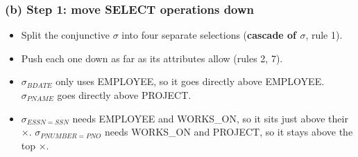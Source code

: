 \documentclass[10pt,a4paper]{article}
\newcommand{\aq}{\text{'Aquarius'}}
\newcommand{\bd}{\text{'1957-12-31'}}
\begin{document}
\subsubsection*{(b) Step 1: move SELECT operations down}
\begin{minipage}[c]{0.5\linewidth}\centering
{}
\end{minipage}\hfill
\begin{minipage}[c]{0.46\linewidth}
\begin{itemize}
  \item Split the conjunctive $\sigma$ into four separate selections (\textbf{cascade of $\sigma$}, rule 1).
  \item Push each one down as far as its attributes allow (rules 2, 7).
  \item $\sigma_{BDATE}$ only uses EMPLOYEE, so it goes directly above EMPLOYEE. $\sigma_{PNAME}$ goes directly above PROJECT.
  \item $\sigma_{ESSN=SSN}$ needs EMPLOYEE and WORKS\_ON, so it sits just above their $\times$. $\sigma_{PNUMBER=PNO}$ needs WORKS\_ON and PROJECT, so it stays above the top $\times$.
\end{itemize}
\end{minipage}
\end{document}
